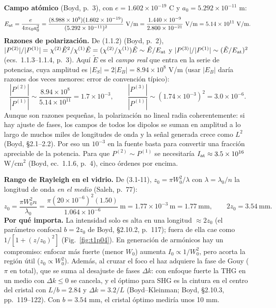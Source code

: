  \textbf{Campo atómico} (Boyd, p.~3), con $e=1.602\times10^{-19}$ C y $a_0=5.292\times10^{-11}$ m:
\begin{equation*}
E_{\rm at}=\frac{e}{4\pi\epsilon_0a_0^2}=\frac{(8.988\times10^9)(1.602\times10^{-19})}{(5.292\times10^{-11})^2}\ \mathrm{V/m}
=\frac{1.440\times10^{-9}}{2.800\times10^{-21}}\ \mathrm{V/m}=5.14\times10^{11}\ \mathrm{V/m}.
\end{equation*}
\textbf{Razones de polarización.} De (1.1.2) (Boyd, p.~2), $|P^{(2)}|/|P^{(1)}|=\chi^{(2)}\tilde E^2/\chi^{(1)}\tilde E
=(\chi^{(2)}/\chi^{(1)})\tilde E\sim\tilde E/E_{\rm at}$ y $|P^{(3)}|/|P^{(1)}|\sim(\tilde E/E_{\rm at})^2$ (ecs.~1.1.3--1.1.4,
p.~3). Aquí $\tilde E$ es el \emph{campo real} que entra en la serie de potencias, cuya amplitud es
$|E_S|=2|E_B|=8.94\times10^8$ V/m (usar $|E_B|$ daría razones dos veces menores: error de convención típico):
\begin{equation*}
\frac{|P^{(2)}|}{|P^{(1)}|}\sim\frac{8.94\times10^8}{5.14\times10^{11}}=1.7\times10^{-3},\qquad
\frac{|P^{(3)}|}{|P^{(1)}|}\sim(1.74\times10^{-3})^2=3.0\times10^{-6}.
\end{equation*}
Aunque son razones pequeñas, la polarización no lineal radia coherentemente: si hay ajuste de fases,
los campos de todos los dipolos se suman en amplitud a lo largo de muchos miles de longitudes de onda
y la señal generada crece como $L^2$ (Boyd, §2.1--2.2). Por eso un $10^{-3}$ en la fuente basta para
convertir una fracción apreciable de la potencia. Para que $P^{(2)}\sim P^{(1)}$ se necesitaría
$I_{\rm at}\approx3.5\times10^{16}$ W/cm$^2$ (Boyd, ec.~1.1.6, p.~4), cinco órdenes por encima.

 \textbf{Rango de Rayleigh en el vidrio.} De (3.1-11), $z_0=\pi W_0^2/\lambda$ con $\lambda=\lambda_0/n$ la
longitud de onda \emph{en el medio} (Saleh, p.~77):
\begin{equation*}
z_0=\frac{\pi W_0^2n}{\lambda_0}=\frac{\pi(20\times10^{-6})^2(1.50)}{1.064\times10^{-6}}\ \mathrm m=1.77\times10^{-3}\ \mathrm m=1.77\ \mathrm{mm},
\qquad 2z_0=3.54\ \mathrm{mm}.
\end{equation*}
\textbf{Por qué importa.} La intensidad solo es alta en una longitud $\approx2z_0$ (el parámetro
confocal $b=2z_0$ de Boyd, §2.10.2, p.~117); fuera de ella cae como $1/[1+(z/z_0)^2]$ (Fig.~\ref{fig:t1p04}).
En generación de armónicos hay un compromiso: enfocar más fuerte (menor $W_0$) aumenta $I_0\propto1/W_0^2$,
pero acorta la región útil ($z_0\propto W_0^2$). Además, al cruzar el foco el haz adquiere la fase de
Gouy ($\pi$ en total), que se suma al desajuste de fases $\Delta k$: con enfoque fuerte la THG en un
medio con $\Delta k\le0$ se cancela, y el óptimo para SHG es la cintura en el centro del cristal con
$L/b=2.84$ y $\Delta k=3.2/L$ (Boyd--Kleinman; Boyd, §2.10.3, pp.~119--122). Con $b=3.54$ mm, el
cristal óptimo mediría unos 10 mm.

